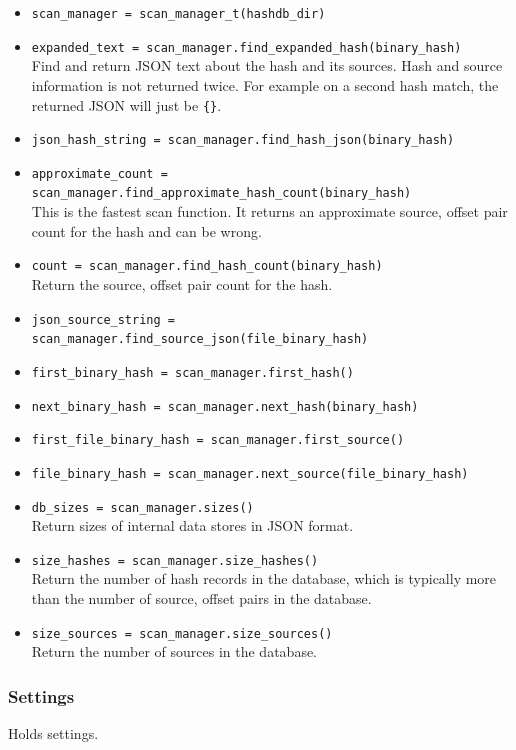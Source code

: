 \documentclass[11pt,fleqn]{article} %
\begin{document}
\begin{itemize}
\item \verb+scan_manager = scan_manager_t(hashdb_dir)+
\item \verb+expanded_text = scan_manager.find_expanded_hash(binary_hash)+\\
Find and return JSON text about the hash and its sources. Hash and source information is not returned twice. For example on a second hash match, the returned JSON will just be \verb+{}+.
\item \verb+json_hash_string = scan_manager.find_hash_json(binary_hash)+
\item \verb+approximate_count = scan_manager.find_approximate_hash_count(binary_hash)+\\
This is the fastest scan function. It returns an approximate source, offset pair count for the hash and can be wrong.
\item \verb+count = scan_manager.find_hash_count(binary_hash)+\\
Return the source, offset pair count for the hash.
\item \verb+json_source_string = scan_manager.find_source_json(file_binary_hash)+
\item \verb+first_binary_hash = scan_manager.first_hash()+
\item \verb+next_binary_hash = scan_manager.next_hash(binary_hash)+
\item \verb+first_file_binary_hash = scan_manager.first_source()+
\item \verb+file_binary_hash = scan_manager.next_source(file_binary_hash)+
\item \verb+db_sizes = scan_manager.sizes()+\\
Return sizes of internal data stores in JSON format.
\item \verb+size_hashes = scan_manager.size_hashes()+\\
Return the number of hash records in the database, which is typically more than the number of source, offset pairs in the database.
\item \verb+size_sources = scan_manager.size_sources()+\\
Return the number of sources in the database.
\end{itemize}

\subsubsection{Settings}
Holds \hdb settings.
\end{document}
